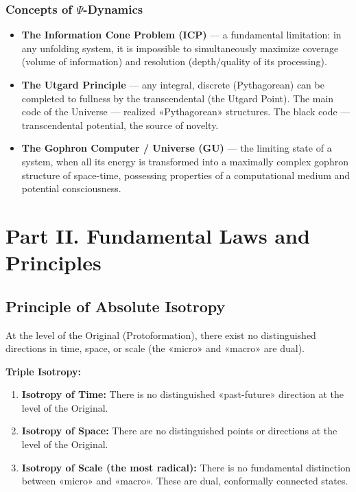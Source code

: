 \documentclass[a4paper,12pt]{article}
\begin{document}
	\subsubsection{Concepts of $\Psi$-Dynamics}
	
	\begin{itemize}
		\item \textbf{The Information Cone Problem (ICP)} — a fundamental limitation: in any unfolding system, it is impossible to simultaneously maximize coverage (volume of information) and resolution (depth/quality of its processing).
		\item \textbf{The Utgard Principle} — any integral, discrete (Pythagorean) can be completed to fullness by the transcendental (the Utgard Point). The main code of the Universe — realized «Pythagorean» structures. The black code — transcendental potential, the source of novelty.
		\item \textbf{The Gophron Computer / Universe (GU)} — the limiting state of a system, when all its energy is transformed into a maximally complex gophron structure of space-time, possessing properties of a computational medium and potential consciousness.
	\end{itemize}
	
	\newpage
	\section{Part II. Fundamental Laws and Principles}
	
	\subsection{Principle of Absolute Isotropy}
	
	At the level of the Original (Protoformation), there exist no distinguished directions in time, space, or scale (the «micro» and «macro» are dual).
	
	\textbf{Triple Isotropy:}
	\begin{enumerate}
		\item \textbf{Isotropy of Time:} There is no distinguished «past-future» direction at the level of the Original.
		\item \textbf{Isotropy of Space:} There are no distinguished points or directions at the level of the Original.
		\item \textbf{Isotropy of Scale (the most radical):} There is no fundamental distinction between «micro» and «macro». These are dual, conformally connected states.
	\end{enumerate}
	
\end{document}

